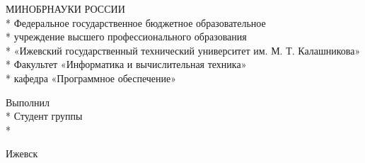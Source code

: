 \begin{titlepage}
\newpage

\begin{center}
МИНОБРНАУКИ РОССИИ\\*
Федеральное государственное бюджетное образовательное\\*
учреждение высшего профессионального образования\\*
«Ижевский государственный технический университет им. М. Т. Калашникова»\\*
Факультет «Информатика и вычислительная техника»\\*
кафедра «Программное обеспечение»
\vspace{1cm}
\end{center}

\vspace{8em}

\begin{center}
\titletext
\end{center}

\vspace{2.5em}

\vspace{6em}

\begin{flushleft}
    Выполнил\\*
    Студент группы \mygroup \hfill \myname\\*
    \vspace{1.5em}
\end{flushleft}

\vspace{\fill}

\begin{center}
    Ижевск \myyear
\end{center}

\end{titlepage}
